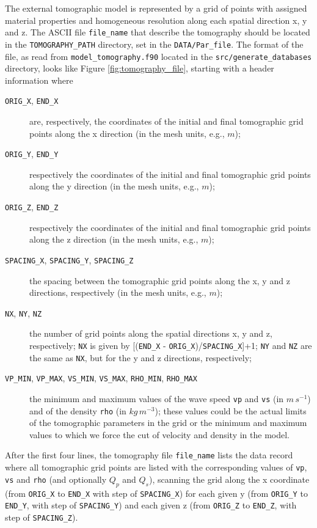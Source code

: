 The external tomographic model is represented by a grid of points
with assigned material properties and homogeneous resolution along
each spatial direction x, y and z. The ASCII file \texttt{file\_name}
that describe the tomography should be located in the \texttt{TOMOGRAPHY\_PATH}
directory, set in the \texttt{DATA/Par\_file}. The format of the file,
as read from \texttt{model\_tomography.f90} located in the \texttt{src/generate\_databases}
directory, looks like Figure \ref{fig:tomography_file}, starting with a header information where
\begin{description}
\item [{\texttt{ORIG\_X}, \texttt{END\_X}}] are, respectively, the coordinates
of the initial and final tomographic grid points along the x direction
(in the mesh units, e.g., $m$);
\item [{\texttt{ORIG\_Y}, \texttt{END\_Y}}] respectively the coordinates
of the initial and final tomographic grid points along the y direction
(in the mesh units, e.g., $m$);
\item [{\texttt{ORIG\_Z}, \texttt{END\_Z}}] respectively the coordinates
of the initial and final tomographic grid points along the z direction
(in the mesh units, e.g., $m$);
\item [{\texttt{SPACING\_X}, \texttt{SPACING\_Y}, \texttt{SPACING\_Z}}] the
spacing between the tomographic grid points along the x, y and z directions,
respectively (in the mesh units, e.g., $m$);
\item [{\texttt{NX}, \texttt{NY}, \texttt{NZ}}] the number of grid points
along the spatial directions x, y and z, respectively; \texttt{NX}
is given by {[}(\texttt{END\_X} - \texttt{ORIG\_X})/\texttt{SPACING\_X}{]}+1;
\texttt{NY} and \texttt{NZ} are the same as \texttt{NX}, but for the
y and z directions, respectively;
\item [{\texttt{VP\_MIN}, \texttt{VP\_MAX}, \texttt{VS\_MIN}, \texttt{VS\_MAX}, \texttt{RHO\_MIN}, \texttt{RHO\_MAX}}] the
minimum and maximum values of the wave speed \texttt{vp} and \texttt{vs}
(in $m\, s^{-1}$) and of the density \texttt{rho} (in $kg\, m^{-3}$);
these values could be the actual limits of the tomographic parameters
in the grid or the minimum and maximum values to which we force the
cut of velocity and density in the model.
\end{description}
After the first four lines, the tomography file \texttt{file\_name} lists the data record where all tomographic
grid points are listed with the corresponding values of \texttt{vp},
\texttt{vs} and \texttt{rho} (and optionally $Q_{p}$ and $Q_{s}$), scanning the grid along the x coordinate
(from \texttt{ORIG\_X} to \texttt{END\_X} with step of \texttt{SPACING\_X})
for each given y (from \texttt{ORIG\_Y} to \texttt{END\_Y}, with step
of \texttt{SPACING\_Y}) and each given z (from \texttt{ORIG\_Z} to
\texttt{END\_Z}, with step of \texttt{SPACING\_Z}).

